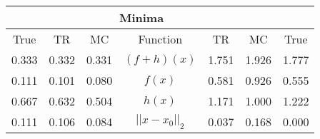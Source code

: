 \begin{tabular}{| c |c |c || c |c |c |c |}
    \hline
    \rowcolor[gray]{0.9}
\multicolumn{3}{|c|}{Parameters} & \multicolumn{4}{|c|}{Minima}\\ \hline True & TR & MC  & Function & TR & MC & True \\
    \hline
  \rowcolor[gray]{0.7}
  0.333 & 0.332 & 0.331   & $ (f + h)(x) $ & 1.751 & 1.926 & 1.777 \\
  \rowcolor[gray]{0.8}
  0.111 & 0.101 & 0.080   & $ f(x) $ & 0.581 & 0.926 & 0.555 \\
  \rowcolor[gray]{0.7}
  0.667 & 0.632 & 0.504   & $ h(x) $ & 1.171 & 1.000 & 1.222 \\
  \rowcolor[gray]{0.8}
  0.111 & 0.106 & 0.084   & $ ||x - x_0||_2 $ & 0.037 & 0.168 & 0.000 \\
\end{tabular}
